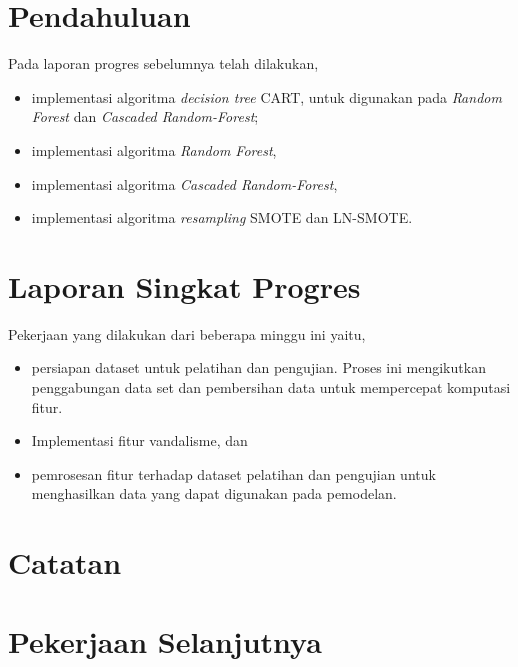 






\section{Pendahuluan}

Pada laporan progres sebelumnya telah dilakukan,

\begin{itemize}
\item implementasi algoritma \textit{decision tree} CART, untuk digunakan pada
\textit{Random Forest} dan \textit{Cascaded Random-Forest};
\item implementasi algoritma \textit{Random Forest},
\item implementasi algoritma \textit{Cascaded Random-Forest},
\item implementasi algoritma \textit{resampling} SMOTE dan LN-SMOTE.
\end{itemize}

\section{Laporan Singkat Progres}

Pekerjaan yang dilakukan dari beberapa minggu ini yaitu,
\begin{itemize}
\item persiapan dataset untuk pelatihan dan pengujian. Proses ini mengikutkan
penggabungan data set dan pembersihan data untuk mempercepat komputasi fitur.
\item Implementasi fitur vandalisme, dan
\item pemrosesan fitur terhadap dataset pelatihan dan pengujian untuk
menghasilkan data yang dapat digunakan pada pemodelan.
\end{itemize}

\section{Catatan}




\clearpage
\section{Pekerjaan Selanjutnya}

